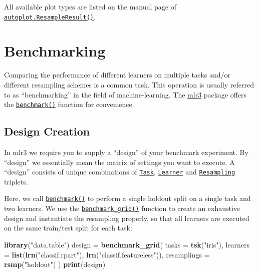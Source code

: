 \documentclass[]{scrbook}
\newenvironment{Shaded}{\begin{snugshade}}{\end{snugshade}}
\newcommand{\DataTypeTok}[1]{\textcolor[rgb]{0.13,0.29,0.53}{#1}}
\newcommand{\KeywordTok}[1]{\textcolor[rgb]{0.13,0.29,0.53}{\textbf{#1}}}
\newcommand{\NormalTok}[1]{#1}
\newcommand{\StringTok}[1]{\textcolor[rgb]{0.31,0.60,0.02}{#1}}
\renewenvironment{Shaded} {\begin{snugshade}\small} {\end{snugshade}}
\begin{document}
All available plot types are listed on the manual page of \href{https://mlr3viz.mlr-org.com/reference/autoplot.ResampleResult.html}{\texttt{autoplot.ResampleResult()}}.

\hypertarget{benchmarking}{%
\section{Benchmarking}\label{benchmarking}}

Comparing the performance of different learners on multiple tasks and/or different resampling schemes is a common task.
This operation is usually referred to as ``benchmarking'' in the field of machine-learning.
The \href{https://mlr3.mlr-org.com}{mlr3} package offers the \href{https://mlr3.mlr-org.com/reference/benchmark.html}{\texttt{benchmark()}} function for convenience.

\hypertarget{bm-design}{%
\subsection{Design Creation}\label{bm-design}}

In mlr3 we require you to supply a ``design'' of your benchmark experiment.
By ``design'' we essentially mean the matrix of settings you want to execute.
A ``design'' consists of unique combinations of \href{https://mlr3.mlr-org.com/reference/Task.html}{\texttt{Task}}, \href{https://mlr3.mlr-org.com/reference/Learner.html}{\texttt{Learner}} and \href{https://mlr3.mlr-org.com/reference/Resampling.html}{\texttt{Resampling}} triplets.

Here, we call \href{https://mlr3.mlr-org.com/reference/benchmark.html}{\texttt{benchmark()}} to perform a single holdout split on a single task and two learners.
We use the \href{https://mlr3.mlr-org.com/reference/benchmark_grid.html}{\texttt{benchmark\_grid()}} function to create an exhaustive design and instantiate the resampling properly, so that all learners are executed on the same train/test split for each task:

\begin{Shaded}
\begin{Highlighting}[]
\KeywordTok{library}\NormalTok{(}\StringTok{"data.table"}\NormalTok{)}
\NormalTok{design =}\StringTok{ }\KeywordTok{benchmark_grid}\NormalTok{(}
  \DataTypeTok{tasks =} \KeywordTok{tsk}\NormalTok{(}\StringTok{"iris"}\NormalTok{),}
  \DataTypeTok{learners =} \KeywordTok{list}\NormalTok{(}\KeywordTok{lrn}\NormalTok{(}\StringTok{"classif.rpart"}\NormalTok{), }\KeywordTok{lrn}\NormalTok{(}\StringTok{"classif.featureless"}\NormalTok{)),}
  \DataTypeTok{resamplings =} \KeywordTok{rsmp}\NormalTok{(}\StringTok{"holdout"}\NormalTok{)}
\NormalTok{)}
\KeywordTok{print}\NormalTok{(design)}
\end{Highlighting}
\end{Shaded}
\end{document}

